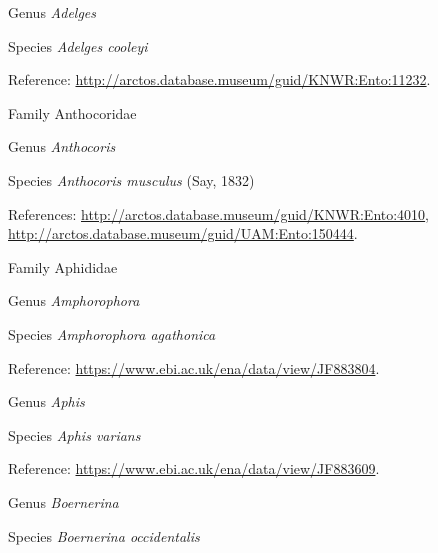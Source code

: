 \documentclass[9pt, article]{memoir}
\begin{document}
\begin{multicols}{2}
\vspace{6pt}\noindent\hspace{30pt}Genus \textit{Adelges}


\vspace{6pt}\noindent\hspace{36pt}Species \textit{Adelges cooleyi}


Reference: 
\url{http://arctos.database.museum/guid/KNWR:Ento:11232}.

\vspace{6pt}\noindent\hspace{24pt}Family Anthocoridae


\vspace{6pt}\noindent\hspace{30pt}Genus \textit{Anthocoris}


\vspace{6pt}\noindent\hspace{36pt}Species \textit{Anthocoris musculus} (Say, 1832)


References: 
\url{http://arctos.database.museum/guid/KNWR:Ento:4010}, 
\url{http://arctos.database.museum/guid/UAM:Ento:150444}.

\vspace{6pt}\noindent\hspace{24pt}Family Aphididae


\vspace{6pt}\noindent\hspace{30pt}Genus \textit{Amphorophora}


\vspace{6pt}\noindent\hspace{36pt}Species \textit{Amphorophora agathonica}


Reference: 
\url{https://www.ebi.ac.uk/ena/data/view/JF883804}.

\vspace{6pt}\noindent\hspace{30pt}Genus \textit{Aphis}


\vspace{6pt}\noindent\hspace{36pt}Species \textit{Aphis varians}


Reference: 
\url{https://www.ebi.ac.uk/ena/data/view/JF883609}.

\vspace{6pt}\noindent\hspace{30pt}Genus \textit{Boernerina}


\vspace{6pt}\noindent\hspace{36pt}Species \textit{Boernerina occidentalis}



\end{multicols}
\end{document}
